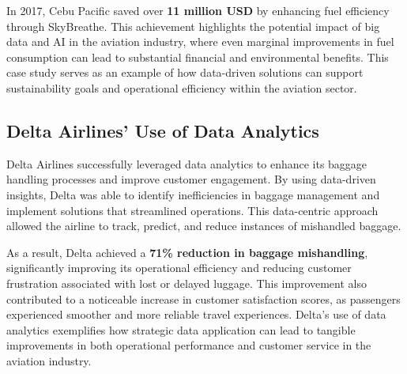 \documentclass[12pt, a4paper]{article}
\begin{document}
    In 2017, Cebu Pacific saved over \textbf{11 million USD} by enhancing fuel
    efficiency through SkyBreathe. This achievement highlights the potential
    impact of big data and AI in the aviation industry, where even marginal
    improvements in fuel consumption can lead to substantial financial and
    environmental benefits. This case study serves as an example of how
    data-driven solutions can support sustainability goals and operational
    efficiency within the aviation sector.
    \subsection{Delta Airlines’ Use of Data Analytics}
    Delta Airlines successfully leveraged data analytics to enhance its baggage
    handling processes and improve customer engagement. By using data-driven
    insights, Delta was able to identify inefficiencies in baggage management
    and implement solutions that streamlined operations. This data-centric
    approach allowed the airline to track, predict, and reduce instances of
    mishandled baggage.

    As a result, Delta achieved a \textbf{71\% reduction in baggage
    mishandling}, significantly improving its operational efficiency and
    reducing customer frustration associated with lost or delayed luggage. This
    improvement also contributed to a noticeable increase in customer
    satisfaction scores, as passengers experienced smoother and more reliable
    travel experiences. Delta’s use of data analytics exemplifies how strategic
    data application can lead to tangible improvements in both operational
    performance and customer service in the aviation industry.
\end{document}
